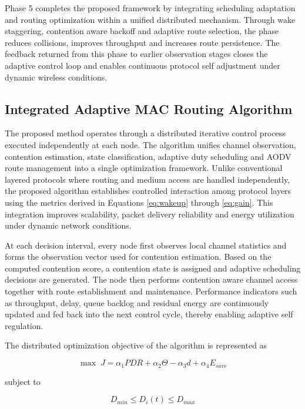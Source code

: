 \documentclass[a4paper,fleqn,final,1p]{cas-dc}
\numberwithin{equation}{section}
\begin{document}
Phase 5 completes the proposed framework by integrating scheduling adaptation and routing optimization within a unified distributed mechanism. Through wake staggering, contention aware backoff and adaptive route selection, the phase reduces collisions, improves throughput and increases route persistence. The feedback returned from this phase to earlier observation stages closes the adaptive control loop and enables continuous protocol self adjustment under dynamic wireless conditions.

\subsection{Integrated Adaptive MAC Routing Algorithm}

The proposed method operates through a distributed iterative control process executed independently at each node. The algorithm unifies channel observation, contention estimation, state classification, adaptive duty scheduling and AODV route management into a single optimization framework. Unlike conventional layered protocols where routing and medium access are handled independently, the proposed algorithm establishes controlled interaction among protocol layers using the metrics derived in Equations \ref{eq:wakeup} through \ref{eq:gain}. This integration improves scalability, packet delivery reliability and energy utilization under dynamic network conditions.

At each decision interval, every node first observes local channel statistics and forms the observation vector used for contention estimation. Based on the computed contention score, a contention state is assigned and adaptive scheduling decisions are generated. The node then performs contention aware channel access together with route establishment and maintenance. Performance indicators such as throughput, delay, queue backlog and residual energy are continuously updated and fed back into the next control cycle, thereby enabling adaptive self regulation.

The distributed optimization objective of the algorithm is represented as

\begin{equation}
\max \; J
=
\alpha_1 PDR
+\alpha_2 \Theta
-\alpha_3 d
+\alpha_4 E_{save}
\label{eq:objective}
\end{equation}

subject to

\begin{equation}
D_{min}\le D_i(t)\le D_{max}
\label{eq:const1}
\end{equation}
\end{document}
